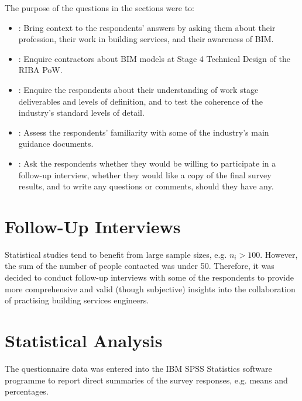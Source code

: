 \noindent
The purpose of the questions in the sections were to:
\begin{itemize}
	\item {}:
	Bring context to the respondents’ answers by asking them about their profession, their work in building services, and their awareness of BIM.
	
	\item {}:
	Enquire contractors about BIM models at Stage 4 Technical Design of the RIBA PoW.
	
	\item {}:
	Enquire the respondents about their understanding of work stage deliverables and levels of definition, and to test the coherence of the industry's standard levels of detail.
	
	\item {}:
	Assess the respondents' familiarity with some of the industry's main guidance documents.
	
	\item {}:
	Ask the respondents whether they would be willing to participate in a follow-up interview, whether they would like a copy of the final survey results, and to write any questions or comments, should they have any.
\end{itemize}


\section{Follow-Up Interviews}

Statistical studies tend to benefit from large sample sizes, e.g. $ n_i>100 $.
However, the sum of the number of people contacted was under 50.
Therefore, it was decided to conduct follow-up interviews with some of the respondents to provide more comprehensive and valid (though subjective) insights into the collaboration of practising building services engineers.


\section{Statistical Analysis}

The questionnaire data was entered into the IBM SPSS Statistics software programme to report direct summaries of the survey responses, e.g. means and percentages.



